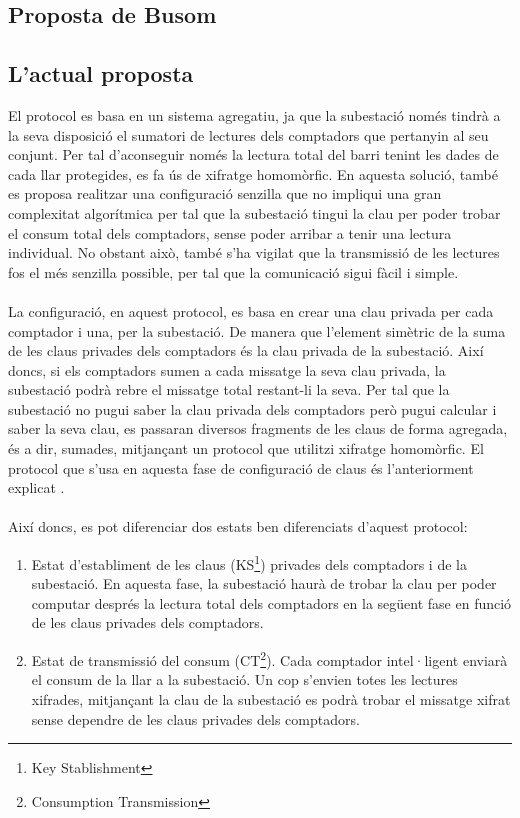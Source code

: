 \documentclass{article}
\begin{document}
\subsection{Proposta de Busom}

\subsection{L'actual proposta}
El protocol \cite{recsi} es basa en un sistema agregatiu, ja que la subestació només tindrà a la seva disposició el sumatori de lectures dels comptadors que pertanyin al seu conjunt. Per tal d'aconseguir només la lectura total del barri tenint les dades de cada llar protegides, es fa ús de xifratge homomòrfic.
En aquesta solució, també es proposa realitzar una configuració senzilla que no impliqui una gran complexitat algorítmica per tal que la subestació tingui la clau per poder trobar el consum total dels comptadors, sense poder arribar a tenir una lectura individual. No obstant això, també s'ha vigilat que la transmissió de les lectures fos el més senzilla possible, per tal que la comunicació sigui fàcil i simple.\\
\\
 La configuració, en aquest protocol, es basa en crear una clau privada per cada comptador i una, per la subestació. De manera que l'element simètric de la suma de les claus privades dels comptadors és la clau privada de la subestació. Així doncs, si els comptadors sumen a cada missatge la seva clau privada, la subestació podrà rebre el missatge total restant-li la seva. Per tal que la subestació no pugui saber la clau privada dels comptadors però pugui calcular i saber la seva clau, es passaran diversos fragments de les claus de forma agregada, és a dir, sumades, mitjançant un protocol que utilitzi xifratge homomòrfic. El protocol que s'usa en aquesta fase de configuració de claus és l'anteriorment explicat \cite{busom}.
\\\\
Així doncs, es pot diferenciar dos estats ben diferenciats d'aquest protocol:
\begin{enumerate}
\item Estat d'establiment de les claus (KS\footnote{Key Stablishment}) privades dels comptadors i de la subestació. En aquesta fase, la subestació haurà de trobar la clau per poder computar després la lectura total dels comptadors en la següent fase en funció de les claus privades dels comptadors.
\item Estat de transmissió del consum (CT\footnote{Consumption Transmission}). Cada comptador intel·ligent enviarà el consum de la llar a la subestació. Un cop s'envien totes les lectures xifrades, mitjançant la clau de la subestació es podrà trobar el missatge xifrat sense dependre de les claus privades dels comptadors. 
\end{enumerate}
\end{document}
